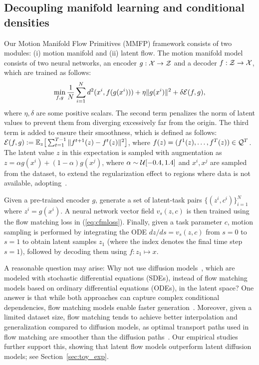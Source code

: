 \subsection{Decoupling manifold learning and conditional densities}
Our Motion Manifold Flow Primitives (MMFP) framework consists of two modules: (i) motion manifold and (ii) latent flow.
The motion manifold model consists of two neural networks, an encoder $g:{\cal X} \to {\cal Z}$ and a decoder $f:{\cal Z} \to {\cal X}$, which are trained as follows:
\begin{equation}
    \min_{f,g} \frac{1}{N}\sum_{i=1}^{N} d^2(x^i, f(g(x^i))) + \eta \| g(x^i)\|^2 + \delta {\cal E}(f,g),
\end{equation}
where $\eta,\delta$ are some positive scalars. The second term penalizes the norm of latent values to prevent them from diverging excessively far from the origin. The third term is added to ensure their smoothness, which is defined as follows: ${\cal E}(f,g):= \mathbb{E}_{z} \big[ \sum_{t=1}^{T-1} \| f^{t+1}(z) - f^t(z)\|^2 \big]$, where $f(z) = (f^1(z), \ldots, f^T(z)) \in {\cal Q}^T$.
The latent value \( z \) in this expectation is sampled with augmentation as \( z = \alpha g(x^i) + (1-\alpha) g(x^j) \), where \( \alpha \sim {\cal U}[-0.4, 1.4] \) and \( x^i, x^j \) are sampled from the dataset, to extend the regularization effect to regions where data is not available, adopting~\cite{yonghyeon2022regularized}.

Given a pre-trained encoder \(g\), generate a set of latent-task pairs \(\{(z^i, c^i)\}_{i=1}^N\) where \(z^i = g(x^i)\). A neural network vector field \(v_s(z, c)\) is then trained using the flow matching loss in (\ref{eq:cfmloss}). Finally, given a task parameter \(c\), motion sampling is performed by integrating the ODE \(dz/ds = v_s(z, c)\) from \(s=0\) to \(s=1\) to obtain latent samples \(z_1\) (where the index denotes the final time step \(s=1\)), followed by decoding them using \(f : z_1 \mapsto x\).


A reasonable question may arise: Why not use diffusion models~\cite{song2020score}, which are modeled with stochastic differential equations (SDEs), instead of flow matching models based on ordinary differential equations (ODEs), in the latent space? One answer is that while both approaches can capture complex conditional dependencies, flow matching models enable faster generation~\cite{lipman2022flow}.
Moreover, given a limited dataset size, flow matching tends to achieve better interpolation and generalization compared to diffusion models, as optimal transport paths used in flow matching are smoother than the diffusion paths~\cite{lipman2022flow}. Our empirical studies further support this, showing that latent flow models outperform latent diffusion models; see Section~\ref{sec:toy_exp}.

